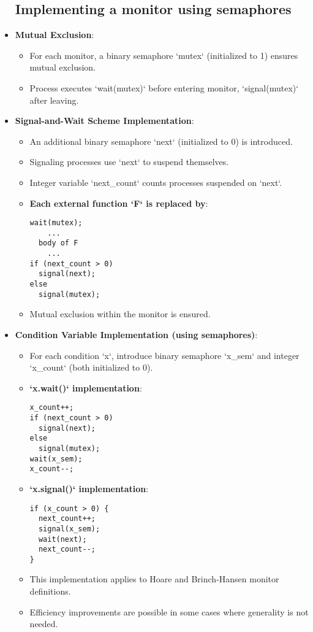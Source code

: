 \begin{itemize}
    \subsection{Implementing a monitor using semaphores}
    \item \textbf{Mutual Exclusion}:
    \begin{itemize}
        \item For each monitor, a binary semaphore `mutex` (initialized to 1) ensures mutual exclusion.
        \item Process executes `wait(mutex)` before entering monitor, `signal(mutex)` after leaving.
    \end{itemize}
    \item \textbf{Signal-and-Wait Scheme Implementation}:
    \begin{itemize}
        \item An additional binary semaphore `next` (initialized to 0) is introduced.
        \item Signaling processes use `next` to suspend themselves.
        \item Integer variable `next\_count` counts processes suspended on `next`.
        \item \textbf{Each external function `F` is replaced by}:
\begin{verbatim}
wait(mutex);
    ...
  body of F
    ...
if (next_count > 0)
  signal(next);
else
  signal(mutex);
\end{verbatim}
        \item Mutual exclusion within the monitor is ensured.
    \end{itemize}
    \item \textbf{Condition Variable Implementation (using semaphores)}:
    \begin{itemize}
        \item For each condition `x`, introduce binary semaphore `x\_sem` and integer `x\_count` (both initialized to 0).
        \item \textbf{`x.wait()` implementation}:
\begin{verbatim}
x_count++;
if (next_count > 0)
  signal(next);
else
  signal(mutex);
wait(x_sem);
x_count--;
\end{verbatim}
        \item \textbf{`x.signal()` implementation}:
\begin{verbatim}
if (x_count > 0) {
  next_count++;
  signal(x_sem);
  wait(next);
  next_count--;
}
\end{verbatim}
        \item This implementation applies to Hoare and Brinch-Hansen monitor definitions.
        \item Efficiency improvements are possible in some cases where generality is not needed.
    \end{itemize}


\end{itemize}

